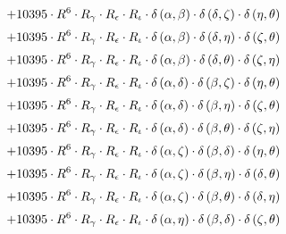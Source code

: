 \begin{subequations}
\begin{gather}
 \\[0.2em] \notag 		 + 10395 \cdot R^{6} \cdot R_{\gamma{}} \cdot R_{\epsilon{}} \cdot R_{\iota{}} \cdot \delta{}\left(\alpha{}, \beta{}\right) \cdot \delta{}\left(\delta{}, \zeta{}\right) \cdot \delta{}\left(\eta{}, \theta{}\right) 
 \\[0.2em] \notag 		 + 10395 \cdot R^{6} \cdot R_{\gamma{}} \cdot R_{\epsilon{}} \cdot R_{\iota{}} \cdot \delta{}\left(\alpha{}, \beta{}\right) \cdot \delta{}\left(\delta{}, \eta{}\right) \cdot \delta{}\left(\zeta{}, \theta{}\right) 
 \\[0.2em] \notag 		 + 10395 \cdot R^{6} \cdot R_{\gamma{}} \cdot R_{\epsilon{}} \cdot R_{\iota{}} \cdot \delta{}\left(\alpha{}, \beta{}\right) \cdot \delta{}\left(\delta{}, \theta{}\right) \cdot \delta{}\left(\zeta{}, \eta{}\right) 
 \\[0.2em] \notag 		 + 10395 \cdot R^{6} \cdot R_{\gamma{}} \cdot R_{\epsilon{}} \cdot R_{\iota{}} \cdot \delta{}\left(\alpha{}, \delta{}\right) \cdot \delta{}\left(\beta{}, \zeta{}\right) \cdot \delta{}\left(\eta{}, \theta{}\right) 
 \\[0.2em] \notag 		 + 10395 \cdot R^{6} \cdot R_{\gamma{}} \cdot R_{\epsilon{}} \cdot R_{\iota{}} \cdot \delta{}\left(\alpha{}, \delta{}\right) \cdot \delta{}\left(\beta{}, \eta{}\right) \cdot \delta{}\left(\zeta{}, \theta{}\right) 
 \\[0.2em] \notag 		 + 10395 \cdot R^{6} \cdot R_{\gamma{}} \cdot R_{\epsilon{}} \cdot R_{\iota{}} \cdot \delta{}\left(\alpha{}, \delta{}\right) \cdot \delta{}\left(\beta{}, \theta{}\right) \cdot \delta{}\left(\zeta{}, \eta{}\right) 
 \\[0.2em] \notag 		 + 10395 \cdot R^{6} \cdot R_{\gamma{}} \cdot R_{\epsilon{}} \cdot R_{\iota{}} \cdot \delta{}\left(\alpha{}, \zeta{}\right) \cdot \delta{}\left(\beta{}, \delta{}\right) \cdot \delta{}\left(\eta{}, \theta{}\right) 
 \\[0.2em] \notag 		 + 10395 \cdot R^{6} \cdot R_{\gamma{}} \cdot R_{\epsilon{}} \cdot R_{\iota{}} \cdot \delta{}\left(\alpha{}, \zeta{}\right) \cdot \delta{}\left(\beta{}, \eta{}\right) \cdot \delta{}\left(\delta{}, \theta{}\right) 
 \\[0.2em] \notag 		 + 10395 \cdot R^{6} \cdot R_{\gamma{}} \cdot R_{\epsilon{}} \cdot R_{\iota{}} \cdot \delta{}\left(\alpha{}, \zeta{}\right) \cdot \delta{}\left(\beta{}, \theta{}\right) \cdot \delta{}\left(\delta{}, \eta{}\right) 
 \\[0.2em] \notag 		 + 10395 \cdot R^{6} \cdot R_{\gamma{}} \cdot R_{\epsilon{}} \cdot R_{\iota{}} \cdot \delta{}\left(\alpha{}, \eta{}\right) \cdot \delta{}\left(\beta{}, \delta{}\right) \cdot \delta{}\left(\zeta{}, \theta{}\right) 

\end{gather}
\end{subequations}
